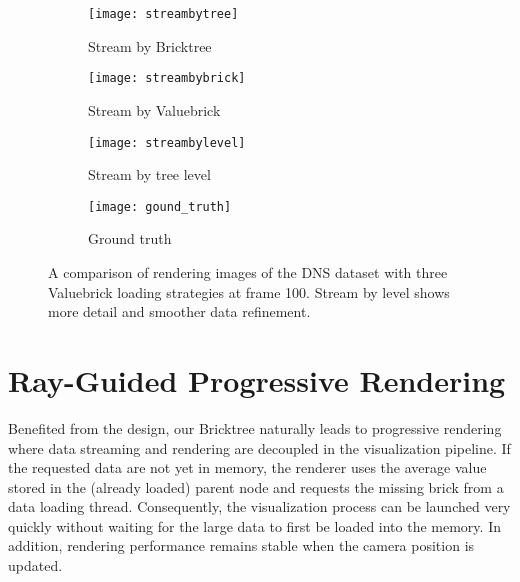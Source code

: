 \begin{figure*}[t]
    \centering
    \begin{subfigure}[b]{0.85\columnwidth}
        \texttt{[image: streambytree]}
        \vspace{-2em}
        \caption{Stream by Bricktree}
        \label{fig:streambytree}
    \end{subfigure}
    \begin{subfigure}[b]{0.85\columnwidth}
        \texttt{[image: streambybrick]}
        \vspace{-2em}
        \caption{Stream by Valuebrick}
        \label{fig:streambybrick}
    \end{subfigure}
    \begin{subfigure}[b]{0.85\columnwidth}
        \texttt{[image: streambylevel]}
        \vspace{-2em}
        \caption{Stream by tree level}
        \label{fig:streambylevel}
    \end{subfigure}
    \begin{subfigure}[b]{0.85\columnwidth}
        \texttt{[image: gound\_truth]}
        \vspace{-2em}
        \caption{Ground truth}
        \label{fig:streambylevel}
    \end{subfigure}
	\caption{\label{fig:streamstrategy}%
	A comparison of rendering images of the DNS dataset with three Valuebrick loading strategies at frame 100. Stream by level shows more detail and smoother data refinement.}
	\vspace{-1em}
\end{figure*}


\section{Ray-Guided Progressive Rendering}
Benefited from the design, our Bricktree naturally leads to progressive rendering
where data streaming and rendering are decoupled in
the visualization pipeline. If the requested data are not yet in memory, the renderer uses 
the average value stored in the (already loaded) parent node
and requests the missing brick from a data loading thread. Consequently,
the visualization process can be launched very quickly without waiting for the large
data to first be loaded into the memory. In addition, rendering performance remains stable 
when the camera position is updated. 


